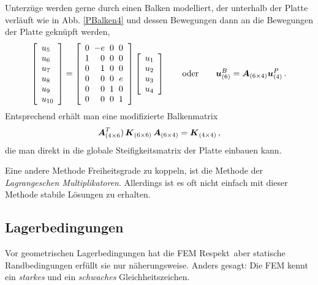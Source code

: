 Unterz\"{u}ge werden gerne durch einen Balken modelliert, der unterhalb der Platte verl\"{a}uft wie in Abb. \ref{PBalken4} und dessen Bewegungen dann an die Bewegungen der Platte gekn\"{u}pft werden,
\begin{align}
 \left [ \barr {l} u_5 \\ u_6 \\u_7 \\u_8 \\u_9 \\ u_{10}\earr \right] =
 \left [ \barr {r@{\hspace{2mm}} r @{\hspace{2mm}}r @{\hspace{2mm}}r @{\hspace{2mm}}}
  0 & -e & 0 & 0  \\
  1 &  0 & 0 & 0  \\
  0 &  1 & 0 & 0  \\
  0 &  0 & 0 & e \\
  0 &  0 & 1 & 0 \\
  0 &  0 & 0 & 1 \earr \right ] \left [ \barr {l} u_1 \\ u_2 \\u_3 \\u_4\earr \right]
  \qquad \mbox{oder} \qquad \vek u_{(6)}^B = \vek A_{(6 \times  4)} \vek u_{(4)}^P\,.
\end{align}
Entsprechend erh\"{a}lt man eine modifizierte Balkenmatrix
\begin{align}
\mbox{\boldmath $A$}^T_{(4 \times 6}) \,\mbox{\boldmath $K$}_{(6 \times  6)} \,\mbox{\boldmath $A$}_{(6 \times 4)} = \mbox{\boldmath $K$}_{(4
\times 4)}\,,
\end{align}
die man direkt in die globale Steifigkeitsmatrix der Platte einbauen kann.

Eine andere Methode Freiheitsgrade zu koppeln, ist die Methode der {\em Lagrangeschen Multiplikatoren\/}. Allerdings ist es oft nicht einfach mit dieser Methode stabile L\"{o}sungen zu erhalten.

{\textcolor{sectionTitleBlue}{\section{Lagerbedingungen}}}\label{Lagerbedingungen}
Vor geometrischen Lagerbedingungen hat die FEM \glq Respekt\grq\, aber statische Randbedingungen
erf\"{u}llt sie nur n\"{a}herungsweise. Anders gesagt: Die FEM kennt ein {\em starkes\/} und ein {\em schwaches\/} Gleichheitszeichen.

